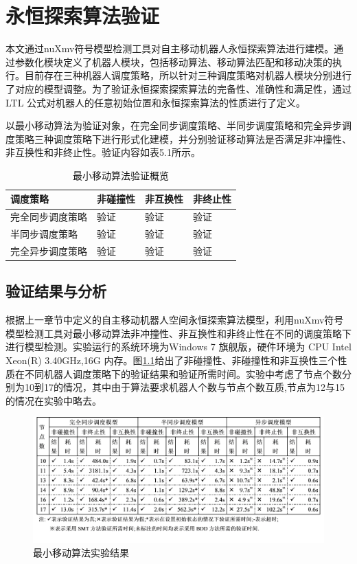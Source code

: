 \chapter{永恒探索算法验证}
本文通过nuXmv符号模型检测工具对自主移动机器人永恒探索算法进行建模。通过参数化模块定义了机器人模块，包括移动算法、移动算法匹配和移动决策的执行。目前存在三种机器人调度策略，所以针对三种调度策略对机器人模块分别进行了对应的模型调整。为了验证永恒探索探索算法的完备性、准确性和满足性，通过LTL 公式对机器人的任意初始位置和永恒探索算法的性质进行了定义。

以最小移动算法为验证对象，在完全同步调度策略、半同步调度策略和完全异步调度策略三种调度策略下进行形式化建模，并分别验证移动算法是否满足非冲撞性、非互换性和非终止性。验证内容如表5.1所示。

\begin{table}[hbt]
	\centering
	\caption{最小移动算法验证概览}
	\begin{tabular}{|p{4cm}|p{2cm}|p{2cm}|p{2cm}|}
		\hline
		\bf{调度策略}&\bf{非碰撞性}&\bf{非互换性}&\bfseries{非终止性} \\
		\hline
		完全同步调度策略&验证&验证&验证 \\
		\hline
		半同步调度策略&验证&验证&验证 \\
		\hline
		完全异步调度策略&验证&验证&验证 \\
		\hline
	\end{tabular}
	\label{table:tableminChecker}
\end{table}

\section{验证结果与分析}
根据上一章节中定义的自主移动机器人空间永恒探索算法模型，利用nuXmv符号模型检测工具对最小移动算法非冲撞性、非互换性和非终止性在不同的调度策略下进行模型检测。实验运行的系统环境为Windows 7 旗舰版，硬件环境为 CPU Intel Xeon(R) 3.40GHz,16G 内存。图\ref{fig:check_result}给出了非碰撞性、非碰撞性和非互换性三个性质在不同机器人调度策略下的验证结果和验证所需时间。实验中考虑了节点个数分别为10到17的情况，其中由于算法要求机器人个数与节点个数互质,节点为12与15的情况在实验中略去。

\begin{figure}[!hbt]
	\centering
	\includegraphics[width=6 in]{fig/check_result.png}
	\caption{最小移动算法实验结果}
	\label{fig:check_result}
\end{figure}

